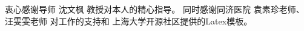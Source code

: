 \begin{acknowledgement}
  衷心感谢导师 沈文枫 教授对本人的精心指导。
  同时感谢同济医院 袁素珍老师、汪雯雯老师 对工作的支持和
  上海大学开源社区提供的Latex模板。
\end{acknowledgement}
